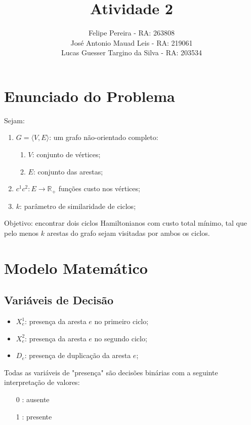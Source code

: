 \documentclass{article}
\title{Atividade 2}
\author{
	Felipe Pereira - RA: 263808 \\
	José Antonio Mauad Leis - RA: 219061 \\
	Lucas Guesser Targino da Silva - RA: 203534
}
\newcommand{\edge}{\ensuremath{e}}
\newcommand{\edges}{\ensuremath{E}}
\newcommand{\vertices}{\ensuremath{V}}
\newcommand{\graph}{\ensuremath{G}}
\newcommand{\co}[1]{\ensuremath{c^{1}}}
\newcommand{\ct}{\ensuremath{c^{2}}}
\newcommand{\positiveReal}{\ensuremath{\mathbb{R}_+}}
\newcommand{\xoe}{\ensuremath{X^{1}_{\edge}}}
\newcommand{\xte}{\ensuremath{X^{2}_{\edge}}}
\newcommand{\de}{\ensuremath{D_{\edge}}}
\newcommand{\similarity}{\ensuremath{k}}
\begin{document}
\maketitle

\section{Enunciado do Problema}

Sejam:

\begin{enumerate}
    \item $\graph = \langle \vertices,\edges \rangle$: um grafo não-orientado completo:
    \begin{enumerate}
        \item $\vertices$: conjunto de vértices;
        \item $\edges$: conjunto das arestas;
    \end{enumerate}
    \item $\co, \ct: \edges \rightarrow \positiveReal$ funções custo nos vértices;
    \item $\similarity$: parâmetro de similaridade de ciclos;
\end{enumerate}

Objetivo: encontrar dois ciclos Hamiltonianos com custo total mínimo, tal que pelo menos $\similarity$ arestas do grafo sejam visitadas por ambos os ciclos.

\section{Modelo Matemático}

\subsection{Variáveis de Decisão}
\label{constraint:variables}

\begin{itemize}
	\item $\xoe$: presença da aresta $\edge$ no primeiro ciclo;
	\item $\xte$: presença da aresta $\edge$ no segundo ciclo;
	\item $\de$: presença de duplicação da aresta $\edge$;
\end{itemize}

Todas as variáveis de "presença" são decisões binárias com a seguinte interpretação de valores:

\begin{itemize}
	\item[0]: ausente
	\item[1]: presente
\end{itemize}
\end{document}
